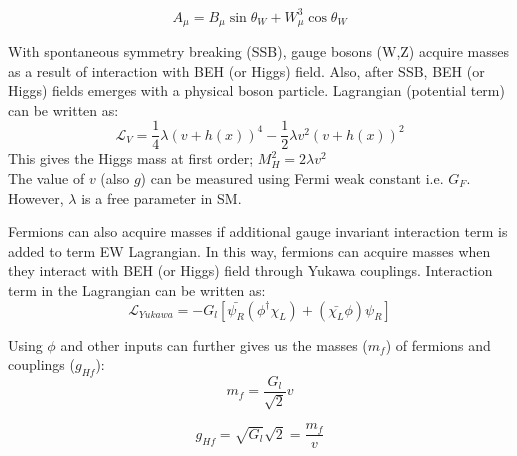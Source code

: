 \begin{equation}
        A_{\mu}= B_{\mu}\sin{\theta_{W}}+W^{3}_{\mu} \cos{\theta_{W}}    %
        \label{amu_term1}
\end{equation}

With spontaneous symmetry breaking (SSB), gauge bosons (W,Z) acquire masses as a result of interaction with BEH (or Higgs) field. 
Also, after SSB, BEH (or Higgs) fields emerges with a physical boson particle. Lagrangian (potential term) can be written as:
\begin{equation}
	\mathscr{L}_{V}= \frac{1}{4}\lambda(v+h(x))^{4}-\frac{1}{2}\lambda v^{2}(v+h(x))^{2}  
	\label{lag_pot}
\end{equation}
This gives the Higgs mass at first order; $M_{H}^2=2\lambda v^2$ \\
The value of $v$ (also $g$) can be measured using Fermi weak constant i.e. $G_{F}$. However, $\lambda$ is a free parameter in SM.

\par Fermions can also acquire masses if additional gauge invariant interaction term is added to term EW Lagrangian. In this way, fermions can acquire masses when they interact with BEH (or Higgs) field through Yukawa couplings. Interaction term in the Lagrangian can be written as:
\begin{equation}
	\mathscr{L}_{Yukawa}= -G_{l}[\bar{\psi_{R}}(\phi^{\dag}\chi_{L})+(\bar{\chi_{L}}\phi)\psi_{R}]                       %
        \label{yukawa}
\end{equation}

Using $\phi$ and other inputs can further gives us the masses ($m_{f}$) of fermions and couplings ($g_{Hf}$):
\begin{equation}
	m_{f}= \frac{G_{l}}{\sqrt{2}}v       %
        \label{fermion_mass}
\end{equation}

\begin{equation}
	g_{Hf}= \sqrt{G_{l}}\sqrt{2}=\frac{m_{f}}{v}       %
        \label{fermion_coupling}
\end{equation}

